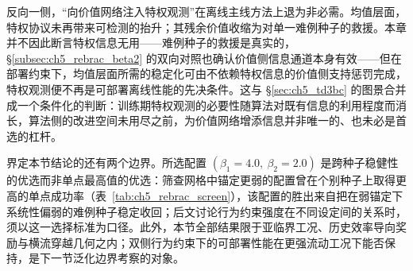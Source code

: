 反向一侧，“向价值网络注入特权观测”在离线主线方法上退为非必需。均值层面，特权协议未再带来可检测的抬升；其残余价值收缩为对单一难例种子的救援。本章并不因此断言特权信息无用——难例种子的救援是真实的，\S\ref{subsec:ch5_rebrac_beta2} 的双向对照也确认价值侧信息通道本身有效——但在部署约束下，均值层面所需的稳定化可由不依赖特权信息的价值侧支持惩罚完成，特权观测便不再是可部署离线性能的先决条件。这与 \S\ref{sec:ch5_td3bc} 的图景合并成一个条件化的判断：训练期特权观测的必要性随算法对既有信息的利用程度而消长，算法侧的改进空间未用尽之前，为价值网络增添信息并非唯一的、也未必是首选的杠杆。

界定本节结论的还有两个边界。所选配置 $(\beta_1{=}4.0,\ \beta_2{=}2.0)$ 是跨种子稳健性的优选而非单点最高值的优选：筛查网格中锚定更弱的配置曾在个别种子上取得更高的单点成功率（表~\ref{tab:ch5_rebrac_screen}），该配置的胜出来自把在弱锚定下系统性偏弱的难例种子稳定收回；后文讨论行为约束强度在不同设定间的关系时，须以这一选择标准为口径。此外，本节全部结果限于亚临界工况、历史效率导向奖励与横流穿越几何之内；双侧行为约束下的可部署性能在更强流动工况下能否保持，是下一节泛化边界考察的对象。

